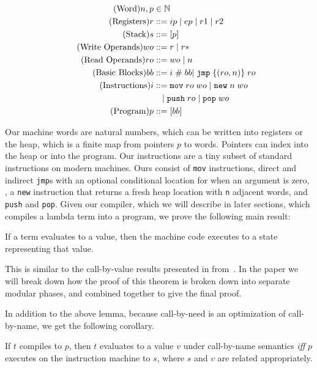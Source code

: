 \begin{align}
  \tag{Word}   n, p &\in \mathbb{N} \\
  \tag{Registers} r &::= ip \; | \; ep \; | \; r1 \; | \; r2  \\
  \tag{Stack}     s &::= [p] \\
  \tag{Write Operands}  wo &::= r \; | \; r* \\
  \tag{Read Operands}  ro &::= wo \; | \; n \\
  \tag{Basic Blocks} bb &::= i \; \# \; bb
                       | \; \texttt{jmp} \; \{(ro, n)\} \; ro \;  \\
  \tag{Instructions} i &::= \texttt{mov} \; ro \; wo \; 
                       | \; \texttt{new} \; n \; wo \; \\
  \notag       & \quad | \; \texttt{push} \; ro \; 
                       | \; \texttt{pop} \; wo \\
  \tag{Program}   p &::= [bb]
\end{align}

Our machine words are natural numbers, which can be written into registers or
the heap, which is a finite map from pointers $p$ to words. Pointers can index
into the heap or into the program. Our instructions are a tiny subset of
standard instructions on modern machines. Ours consist of \texttt{mov}
instructions, direct and indirect \texttt{jmp}s with an optional conditional
location for when an argument is zero, , a \texttt{new} instruction that
returns a fresh heap location with \texttt{n} adjacent words, and \texttt{push}
and \texttt{pop}. Given our compiler, which we will describe in later sections,
which compiles a lambda term into a program, we prove the following main
result:

\begin{theorem}
If a term evaluates to a value, then the machine code executes to a state
representing that value. 
\end{theorem}

This is similar to the call-by-value results presented in
from~\cite{chlipala2007certified}. In the paper we will break down how the proof
of this theorem is broken down into separate modular phases, and combined
together to give the final proof. 

In addition to the above lemma, because call-by-need is an optimization of
call-by-name, we get the following corollary.

\begin{corollary}
If $t$ compiles to $p$, then $t$ evaluates to a value $v$ under call-by-name
semantics \emph{iff} $p$ executes on the instruction machine to $s$, where $s$
and $v$ are related appropriately.
\end{corollary}

